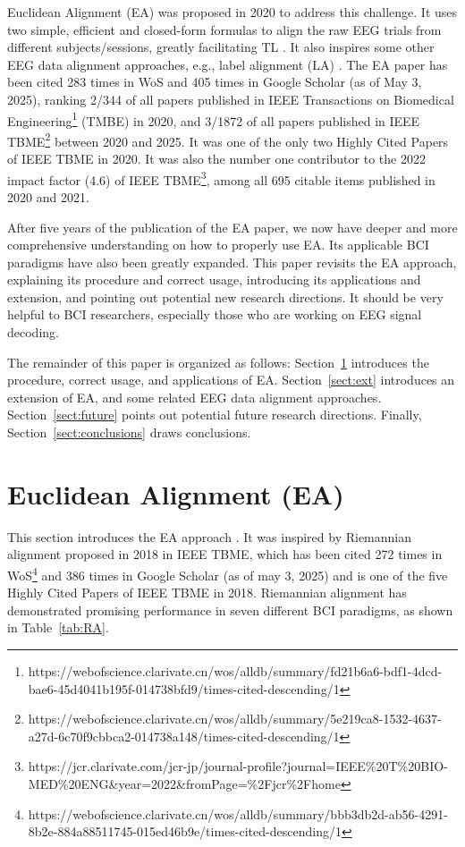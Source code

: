 \documentclass[journal]{IEEEtran}
\begin{document}
Euclidean Alignment (EA) \cite{drwuEA2020} was proposed in 2020 to address this challenge. It uses two simple, efficient and closed-form formulas to align the raw EEG trials from different subjects/sessions, greatly facilitating TL \cite{drwuMITLBCI2022}. It also inspires some other EEG data alignment approaches, e.g., label alignment (LA) \cite{drwuLA2020}. The EA paper has been cited 283 times in WoS and 405 times in Google Scholar (as of May 3, 2025), ranking 2/344 of all papers published in IEEE Transactions on Biomedical Engineering\footnote{https://webofscience.clarivate.cn/wos/alldb/summary/fd21b6a6-bdf1-4dcd-bae6-45d4041b195f-014738bfd9/times-cited-descending/1} (TMBE) in 2020, and 3/1872 of all papers published in IEEE TBME\footnote{https://webofscience.clarivate.cn/wos/alldb/summary/5e219ca8-1532-4637-a27d-6c70f9cbbca2-014738a148/times-cited-descending/1} between 2020 and 2025. It was one of the only two Highly Cited Papers of IEEE TBME in 2020. It was also the number one contributor to the 2022 impact factor (4.6) of IEEE TBME\footnote{https://jcr.clarivate.com/jcr-jp/journal-profile?journal=IEEE\%20T\%20BIO-MED\%20ENG\&year=2022\&fromPage=\%2Fjcr\%2Fhome}, among all 695 citable items published in 2020 and 2021.

After five years of the publication of the EA paper, we now have deeper and more comprehensive understanding on how to properly use EA. Its applicable BCI paradigms have also been greatly expanded. This paper revisits the EA approach, explaining its procedure and correct usage, introducing its applications and extension, and pointing out potential new research directions. It should be very helpful to BCI researchers, especially those who are working on EEG signal decoding.

The remainder of this paper is organized as follows: Section~\ref{sect:EA} introduces the procedure, correct usage, and applications of EA. Section~\ref{sect:ext} introduces an extension of EA, and some related EEG data alignment approaches. Section~\ref{sect:future} points out potential future research directions. Finally, Section~\ref{sect:conclusions} draws conclusions.


\section{Euclidean Alignment (EA)} \label{sect:EA}

This section introduces the EA approach \cite{drwuEA2020}. It was inspired by Riemannian alignment \cite{Zanini2018} proposed in 2018 in IEEE TBME, which has been cited 272 times in WoS\footnote{https://webofscience.clarivate.cn/wos/alldb/summary/bbb3db2d-ab56-4291-8b2e-884a88511745-015ed46b9e/times-cited-descending/1} and 386 times in Google Scholar (as of may 3, 2025) and is one of the five Highly Cited Papers of IEEE TBME in 2018. Riemannian alignment has demonstrated promising performance in seven different BCI paradigms, as shown in Table~\ref{tab:RA}.
\end{document}
